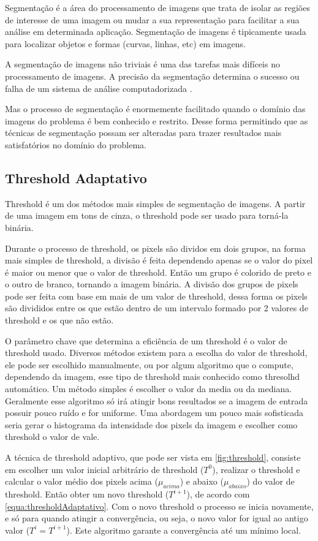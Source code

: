 Segmentação é a área do processamento de imagens que trata de isolar as regiões de interesse de uma imagem ou mudar a sua representação para facilitar a sua análise em determinada aplicação. Segmentação de imagens é tipicamente usada para localizar objetos e formas (curvas, linhas, etc) em imagens.

A segmentação de imagens não triviais é uma das tarefas mais difíceis no processamento de imagens. A precisão da segmentação determina o sucesso ou falha de um sistema de análise computadorizada \cite{gonzalez}.

Mas o processo de segmentação é enormemente facilitado quando o domínio das imagens do problema é bem conhecido e restrito. Desse forma permitindo que as técnicas de segmentação possam ser alteradas para trazer resultados mais satisfatórios no domínio do problema.

\subsection{Threshold Adaptativo}

Threshold é um dos métodos mais simples de segmentação de imagens. A partir de uma imagem em tons de cinza, o threshold pode ser usado para torná-la binária.

Durante o processo de threshold, os pixels são dividos em dois grupos, na forma mais simples de threshold, a divisão é feita dependendo apenas se o valor do pixel é maior ou menor que o valor de threshold. Então um grupo é colorido de preto e o outro de branco, tornando a imagem binária. A divisão dos grupos de pixels pode ser feita com base em mais de um valor de threshold, dessa forma os pixels são divididos entre os que estão dentro de um intervalo formado por 2 valores de threshold e os que não estão.

O parâmetro chave que determina a eficiência de um threshold é o valor de threshold usado. Diversos métodos existem para a escolha do valor de threshold, ele pode ser escolhido manualmente, ou por algum algoritmo que o compute, dependendo da imagem, esse tipo de threshold mais conhecido como thresolhd automático. Um método simples é escolher o valor da media ou da mediana. Geralmente esse algoritmo só irá atingir bons resultados se a imagem de entrada possuir pouco ruído e for uniforme. Uma abordagem um pouco mais sofisticada seria gerar o histograma da intensidade dos pixels da imagem e escolher como threshold o valor de vale.

A técnica de threshold adaptivo, que pode ser vista em \ref{fig:threshold}, consiste em escolher um valor inicial arbitrário de threshold ($T^0$), realizar o threshold e calcular o valor médio dos pixels acima ($\mu_{acima}$) e abaixo ($\mu_{abaixo}$) do valor de threshold. Então obter um novo threshold ($T^{i+1}$), de acordo com \ref{equa:thresholdAdaptativo}. Com o novo threshold o processo se inicia novamente, e só para quando atingir a convergência, ou seja, o novo valor for igual ao antigo valor ($T^i = T^{i+1}$). Este algoritmo garante a convergência até um mínimo local.

